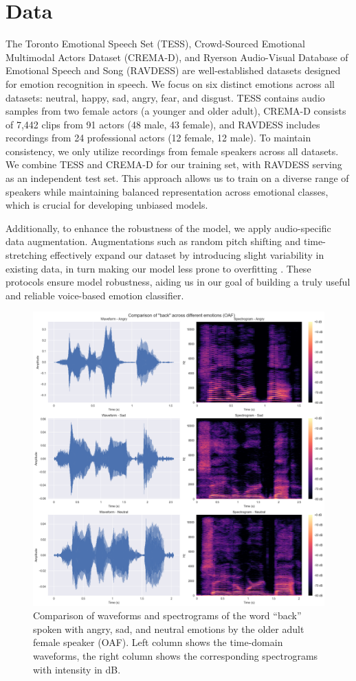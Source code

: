 \documentclass[../main.tex]{subfiles}
\begin{document}
\section{Data}
The Toronto Emotional Speech Set (TESS), Crowd-Sourced Emotional Multimodal Actors Dataset (CREMA-D), and Ryerson Audio-Visual Database of Emotional Speech and Song (RAVDESS) are well-established datasets designed for emotion recognition in speech. We focus on six distinct emotions across all datasets: neutral, happy, sad, angry, fear, and disgust. TESS contains audio samples from two female actors (a younger and older adult), CREMA-D consists of 7,442 clips from 91 actors (48 male, 43 female), and RAVDESS includes recordings from 24 professional actors (12 female, 12 male). To maintain consistency, we only utilize recordings from female speakers across all datasets. We combine TESS and CREMA-D for our training set, with RAVDESS serving as an independent test set. This approach allows us to train on a diverse range of speakers while maintaining balanced representation across emotional classes, which is crucial for developing unbiased models.

Additionally, to enhance the robustness of the model, we apply audio-specific
data augmentation. Augmentations such as random pitch shifting and
time-stretching effectively expand our dataset by introducing slight variability
in existing data, in turn making our model less prone to overfitting 
\citep{Bhatlawande2024}. These protocols ensure model robustness, aiding us in 
our goal of building a truly useful and reliable voice-based emotion classifier.

\begin{figure}[h]
    \centering
    \includegraphics[width= 350pt]{../resources/tess_analysis.png}
    \caption{Comparison of waveforms and spectrograms of the word 
    ``back'' spoken with angry, sad, and neutral emotions by the older adult 
    female speaker (OAF). Left column shows the time-domain waveforms, the 
    right column shows the corresponding spectrograms with intensity in dB.}
    \label{fig:analysis}
\end{figure}
\end{document}

